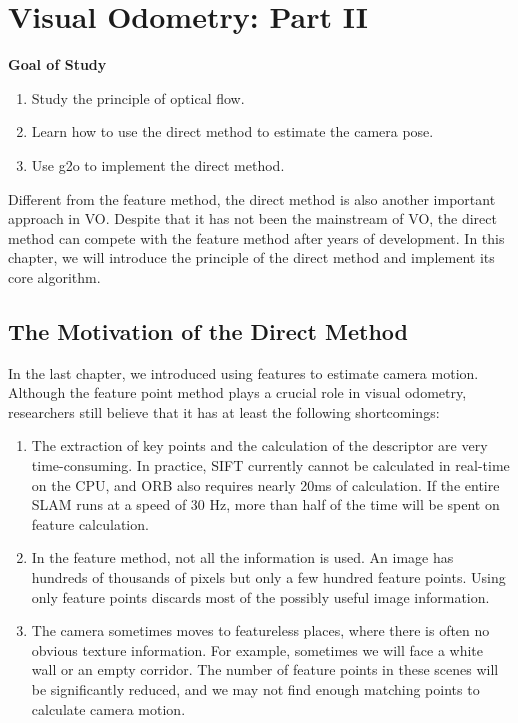 \chapter{Visual Odometry: Part II}
\label{cpt:vo2}
\label{cpt:8}
\begin{mdframed}  
	\textbf{Goal of Study}
	\begin{enumerate}[labelindent=0em,leftmargin=1.5em]
		\item Study the principle of optical flow.
		\item Learn how to use the direct method to estimate the camera pose.
        \item Use g2o to implement the direct method.
	\end{enumerate}
\end{mdframed}

Different from the feature method, the direct method is also another important approach in VO. Despite that it has not been the mainstream of VO, the direct method can compete with the feature method after years of development. In this chapter, we will introduce the principle of the direct method and implement its core algorithm.

\newpage


\newpage
\section{The Motivation of the Direct Method}
In the last chapter, we introduced using features to estimate camera motion. Although the feature point method plays a crucial role in visual odometry, researchers still believe that it has at least the following shortcomings:

\begin{enumerate}
	\item The extraction of key points and the calculation of the descriptor are very time-consuming. In practice, SIFT currently cannot be calculated in real-time on the CPU, and ORB also requires nearly 20ms of calculation. If the entire SLAM runs at a speed of 30 Hz, more than half of the time will be spent on feature calculation.

	\item In the feature method, not all the information is used. An image has hundreds of thousands of pixels but only a few hundred feature points. Using only feature points discards most of the possibly useful image information. 
	
	\item The camera sometimes moves to featureless places, where there is often no obvious texture information. For example, sometimes we will face a white wall or an empty corridor. The number of feature points in these scenes will be significantly reduced, and we may not find enough matching points to calculate camera motion.
\end{enumerate}

